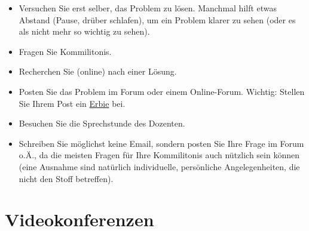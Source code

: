 \documentclass[
  a4paper,
  DIV=11]{scrreprt}
\providecommand{\tightlist}{%
  \setlength{\itemsep}{0pt}\setlength{\parskip}{0pt}}\usepackage{longtable,booktabs,array}
\theoremstyle{definition}
\theoremstyle{definition}
\theoremstyle{remark}
\begin{document}

\begin{itemize}
\tightlist
\item
  Versuchen Sie erst selber, das Problem zu lösen. Manchmal hilft etwas
  Abstand (Pause, drüber schlafen), um ein Problem klarer zu sehen (oder
  es als nicht mehr so wichtig zu sehen).
\item
  Fragen Sie Kommilitonis.
\item
  Recherchen Sie (online) nach einer Lösung.
\item
  Posten Sie das Problem im Forum oder einem Online-Forum. Wichtig:
  Stellen Sie Ihrem Post ein
  \href{https://data-se.netlify.app/2022/01/31/erbie-einfache-reproduzierbare-beispiele-ihres-problems-mit-r-syntax/}{Erbie}
  bei.
\item
  Besuchen Sie die Sprechstunde des Dozenten.
\item
  Schreiben Sie möglichst keine Email, sondern posten Sie Ihre Frage im
  Forum o.Ä., da die meisten Fragen für Ihre Kommilitonis auch nützlich
  sein können (eine Ausnahme sind natürlich individuelle, persönliche
  Angelegenheiten, die nicht den Stoff betreffen).
\end{itemize}

\hypertarget{videokonferenzen}{%
\section*{Videokonferenzen}\label{videokonferenzen}}

\end{document}
